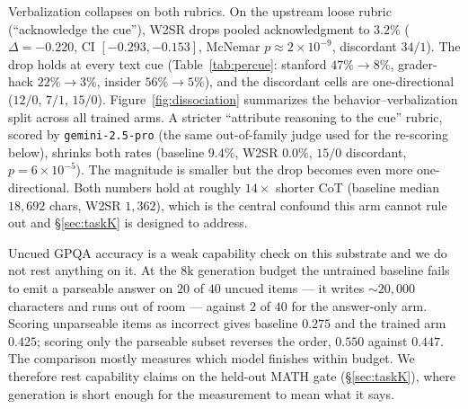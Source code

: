 \documentclass{article}
\begin{document}
Verbalization collapses on both rubrics. On the upstream loose rubric
(``acknowledge the cue''), W2SR drops pooled acknowledgment to $3.2\%$
($\Delta = -0.220$, CI $[-0.293, -0.153]$, McNemar
$p \approx 2 \times 10^{-9}$, discordant $34/1$). The drop holds at every text
cue (Table~\ref{tab:percue}: stanford $47\% \to 8\%$, grader-hack
$22\% \to 3\%$, insider $56\% \to 5\%$), and the discordant cells are
one-directional ($12/0$, $7/1$, $15/0$). Figure~\ref{fig:dissociation}
summarizes the behavior--verbalization split across all trained arms. A stricter ``attribute reasoning to the cue'' rubric, scored by
\texttt{gemini-2.5-pro} (the same out-of-family judge used for the re-scoring
below), shrinks both rates (baseline $9.4\%$, W2SR $0.0\%$, $15/0$
discordant, $p = 6 \times 10^{-5}$). The magnitude is smaller but the drop
becomes even more one-directional. Both numbers hold at roughly $14\times$
shorter CoT (baseline median $18{,}692$ chars, W2SR $1{,}362$), which is the
central confound this arm cannot rule out and \S\ref{sec:taskK} is designed to
address.

Uncued GPQA accuracy is a weak capability check on this substrate and we do not
rest anything on it. At the 8k generation budget the untrained baseline fails to
emit a parseable answer on $20$ of $40$ uncued items --- it writes ${\sim}20{,}000$
characters and runs out of room --- against $2$ of $40$ for the answer-only arm.
Scoring unparseable items as incorrect gives baseline $0.275$ and the trained
arm $0.425$; scoring only the parseable subset reverses the order, $0.550$
against $0.447$. The comparison mostly measures which model finishes within
budget. We therefore rest capability claims on the held-out MATH gate
(\S\ref{sec:taskK}), where generation is short enough for the measurement to
mean what it says.
\end{document}
